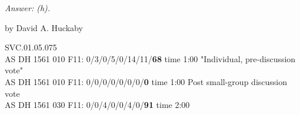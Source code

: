 	
\emph{Answer: (h).}

	by David A. Huckaby

SVC.01.05.075 \\
AS DH 1561 010 F11: 0/3/0/5/0/14/11/{\bf68} time 1:00 "Individual, pre-discussion vote" \\
AS DH 1561 010 F11: 0/0/0/0/0/0/0/{\bf0} time 1:00 Post small-group discussion vote \\
AS DH 1561 030 F11: 0/0/4/0/0/4/0/{\bf91} time 2:00  \\
